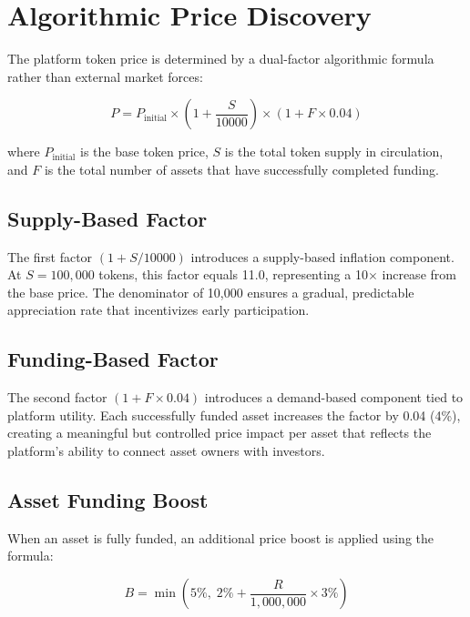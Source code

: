 \documentclass[conference]{IEEEtran}
\begin{document}
\section{Algorithmic Price Discovery}
\label{sec:pricing}

The platform token price is determined by a dual-factor algorithmic formula rather than external market forces:

\begin{equation}
\label{eq:price}
P = P_{\text{initial}} \times \left(1 + \frac{S}{10000}\right) \times \left(1 + F \times 0.04\right)
\end{equation}

\noindent where $P_{\text{initial}}$ is the base token price, $S$ is the total token supply in circulation, and $F$ is the total number of assets that have successfully completed funding.

\subsection{Supply-Based Factor}

The first factor $(1 + S/10000)$ introduces a supply-based inflation component. At $S = 100{,}000$ tokens, this factor equals 11.0, representing a 10$\times$ increase from the base price. The denominator of 10,000 ensures a gradual, predictable appreciation rate that incentivizes early participation.

\subsection{Funding-Based Factor}

The second factor $(1 + F \times 0.04)$ introduces a demand-based component tied to platform utility. Each successfully funded asset increases the factor by 0.04 (4\%), creating a meaningful but controlled price impact per asset that reflects the platform's ability to connect asset owners with investors.

\subsection{Asset Funding Boost}

When an asset is fully funded, an additional price boost is applied using the formula:

\begin{equation}
\label{eq:boost}
B = \min\left(5\%,\; 2\% + \frac{R}{1{,}000{,}000} \times 3\%\right)
\end{equation}
\end{document}
